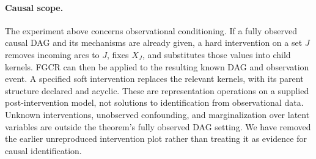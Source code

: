 \paragraph{Causal scope.}
The experiment above concerns observational conditioning.
If a fully observed causal DAG and its mechanisms are already given,
a hard intervention on a set $J$ removes incoming arcs to $J$,
fixes $X_J$, and substitutes those values into child kernels.
FGCR can then be applied to the resulting known DAG and observation
event. A specified soft intervention replaces the relevant kernels,
with its parent structure declared and acyclic. These are representation
operations on a supplied post-intervention model, not solutions to
identification from observational data. Unknown interventions,
unobserved confounding, and marginalization over latent variables are
outside the theorem's fully observed DAG setting. We have removed the
earlier unreproduced intervention plot rather than treating it as
evidence for causal identification.
